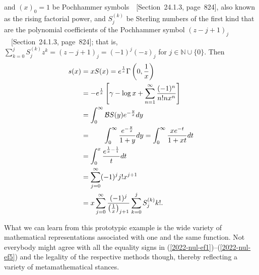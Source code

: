 \documentclass[axioms,article,accept,oneauthor,pdftex]{Definitions/mdpi}
\begin{document}
and $(x)_0=1$
be Pochhammer symbols~\cite{abramowitz:1964:hmf}~[Section~24.1.3, page~824],  also known as the rising factorial power, and
%
%
${S}_j^{(k)}$
be Sterling numbers of the first kind
that are the polynomial coefficients of the
Pochhammer symbol $(z-j+1)_j$~\cite{abramowitz:1964:hmf}~[Section~24.1.3, page~824]; that is,
$ \sum_{k=0}^j {S}_j^{(k)} z^k
= (z-j+1)_j
= (-1)^j  (-z)_j
$
for $j \in \mathbb{N}\cup \{0\}$.
Then
\begin{align}
s(x)
&
=x S(x)
=   e^\frac{1}{x}   \Gamma \left( 0, \frac{1}{x} \right) \nonumber
\\
&
=  - e^\frac{1}{x}   \left[  \gamma - \log x +\sum_{n=1}^\infty \frac{(-1)^n}{n!n x^n} \right]
\label{2022-nul-ef1}
\\
&
=
\int_0^\infty {\cal B}S (y)  e^{-\frac{y}{x}}   dy  \nonumber
\\
&= \qquad \int_0^\infty \frac{ e^{-\frac{y}{x}} }{1+y}    dy= \int_0^\infty \frac{ x e^{-t }}{1+xt}    dt
\label{2022-nul-ef2}
\\
&
=
 \int_0^x  \frac{ e^{ \frac{1}{x} -\frac{1}{t}}}{t} dt
\label{2022-nul-ef3}
\\
&
= \sum_{j=0}^\infty (-1)^j j!  x^{j+1}
\label{2022-nul-ef4}
\\
&
= x \sum_{j=0}^\infty \frac{(-1)^j}{\left(\frac{1}{x}\right)_{j+1}} \sum_{k=0}^j {S}_j^{(k)} k!
.
\label{2022-nul-ef5}
\end{align}

What we can learn from this prototypic example is the wide variety of mathematical representations
associated with one and the same function. Not everybody might agree with all the equality signs
in (\ref{2022-nul-ef1})--(\ref{2022-nul-ef5}) and the legality of the respective methods though,
thereby reflecting a variety of metamathematical stances.
\end{document}
